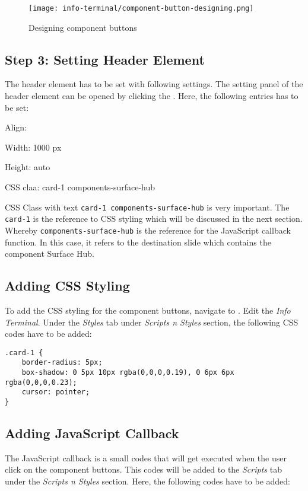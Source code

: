 \begin{figure}[ht]
\caption{Designing component buttons}
\label{fig:component-button-designing}
\centering
\texttt{[image: info-terminal/component-button-designing.png]}
\end{figure}

\subsection*{Step 3: Setting Header Element}
The header element has to be set with following settings. The setting panel of the header element can be opened by clicking the . Here, the following entries has to be set:
\begin{itemize*}
\item Align:
\item Width: 1000 px
\item Height: auto
\item CSS claa: card-1 components-surface-hub
\end{itemize*}

CSS Class with text \texttt{card-1 components-surface-hub} is very important. The \texttt{card-1} is the reference to CSS styling which will be discussed in the next section. Whereby \texttt{components-surface-hub} is the reference for the JavaScript callback function. In this case, it refers to the destination slide which contains the component Surface Hub.

\subsection*{Adding CSS Styling}
To add the CSS styling for the component buttons, navigate to . Edit the \emph{Info Terminal}. Under the \emph{Styles} tab under \emph{Scripts n Styles} section, the following CSS codes have to be added:

\begin{lstlisting}
.card-1 {
	border-radius: 5px;
	box-shadow: 0 5px 10px rgba(0,0,0,0.19), 0 6px 6px rgba(0,0,0,0.23);
	cursor: pointer;
}
\end{lstlisting}

\subsection*{Adding JavaScript Callback}
The JavaScript callback is a small codes that will get executed when the user click on the component buttons. This codes will be added to the \emph{Scripts} tab under the \emph{Scripts n Styles} section. Here, the following codes have to be added:

